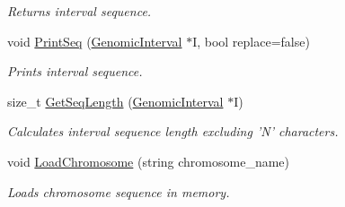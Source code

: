 \begin{DoxyCompactItemize}
\begin{DoxyCompactList}\small\item\em Returns interval sequence. \end{DoxyCompactList}\item 
\hypertarget{classChromosomes_ac732efe7b6dcc645861507257bf66347}{
void \hyperlink{classChromosomes_ac732efe7b6dcc645861507257bf66347}{PrintSeq} (\hyperlink{classGenomicInterval}{GenomicInterval} $\ast$I, bool replace=false)}
\label{classChromosomes_ac732efe7b6dcc645861507257bf66347}

\begin{DoxyCompactList}\small\item\em Prints interval sequence. \end{DoxyCompactList}\item 
\hypertarget{classChromosomes_a044da4339ffcc9a892ea35198bbb9f36}{
size\_\-t \hyperlink{classChromosomes_a044da4339ffcc9a892ea35198bbb9f36}{GetSeqLength} (\hyperlink{classGenomicInterval}{GenomicInterval} $\ast$I)}
\label{classChromosomes_a044da4339ffcc9a892ea35198bbb9f36}

\begin{DoxyCompactList}\small\item\em Calculates interval sequence length excluding 'N' characters. \end{DoxyCompactList}\item 
\hypertarget{classChromosomes_a7f4e8938bd27e1fdb81f7ab33a44d62a}{
void \hyperlink{classChromosomes_a7f4e8938bd27e1fdb81f7ab33a44d62a}{LoadChromosome} (string chromosome\_\-name)}
\label{classChromosomes_a7f4e8938bd27e1fdb81f7ab33a44d62a}

\begin{DoxyCompactList}\small\item\em Loads chromosome sequence in memory. \end{DoxyCompactList}\end{DoxyCompactItemize}
